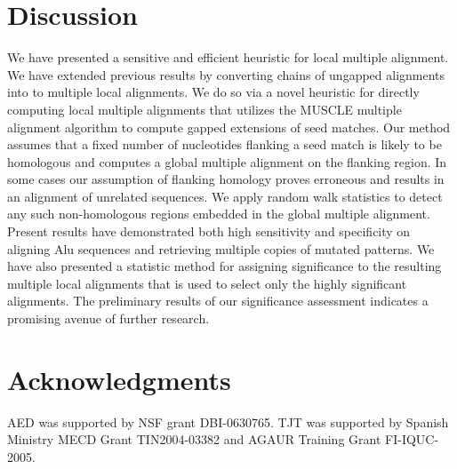 \documentclass[twoside,11pt]{article}
\begin{document}
\section{Discussion}
We have presented a sensitive and efficient heuristic for local multiple alignment.  
We have extended previous results by converting chains of ungapped alignments into to multiple local alignments. We do so via a novel heuristic for directly computing local multiple alignments that utilizes the MUSCLE multiple alignment algorithm to compute gapped extensions of seed matches.  Our method assumes that a fixed number of nucleotides flanking a seed match is likely to be homologous and computes a global multiple alignment on the flanking region.  In some cases our assumption of flanking homology proves erroneous and results in an alignment of unrelated sequences.  We apply random walk statistics to detect any such non-homologous regions embedded in the global multiple alignment.
Present results have demonstrated both high sensitivity and specificity on aligning Alu
sequences and retrieving multiple copies of mutated patterns. We have also presented a statistic method for assigning significance to the resulting multiple local alignments that is used to select only the highly significant alignments. The preliminary results of our significance assessment indicates a promising avenue of further research.



\section{ Acknowledgments }
AED was supported by NSF grant DBI-0630765. TJT was
supported by Spanish Ministry MECD Grant TIN2004-03382 and AGAUR
Training Grant FI-IQUC-2005.

\small

\end{document}
